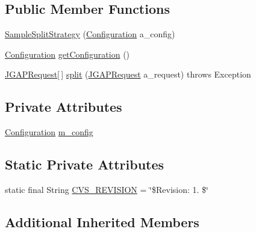 \subsection*{Public Member Functions}
\begin{DoxyCompactItemize}
\item 
\hyperlink{classorg_1_1jgap_1_1distr_1_1grid_1_1_sample_split_strategy_a3142f6f243c14087f08aa8d2aaba6652}{Sample\-Split\-Strategy} (\hyperlink{classorg_1_1jgap_1_1_configuration}{Configuration} a\-\_\-config)
\item 
\hyperlink{classorg_1_1jgap_1_1_configuration}{Configuration} \hyperlink{classorg_1_1jgap_1_1distr_1_1grid_1_1_sample_split_strategy_a196852dac1237e1e02777f5bf3ce816e}{get\-Configuration} ()
\item 
\hyperlink{classorg_1_1jgap_1_1distr_1_1grid_1_1_j_g_a_p_request}{J\-G\-A\-P\-Request}\mbox{[}$\,$\mbox{]} \hyperlink{classorg_1_1jgap_1_1distr_1_1grid_1_1_sample_split_strategy_ac7d09ab06f415b984bfd93703755ebea}{split} (\hyperlink{classorg_1_1jgap_1_1distr_1_1grid_1_1_j_g_a_p_request}{J\-G\-A\-P\-Request} a\-\_\-request)  throws Exception 
\end{DoxyCompactItemize}
\subsection*{Private Attributes}
\begin{DoxyCompactItemize}
\item 
\hyperlink{classorg_1_1jgap_1_1_configuration}{Configuration} \hyperlink{classorg_1_1jgap_1_1distr_1_1grid_1_1_sample_split_strategy_a8b525351206053287f004894a174c54f}{m\-\_\-config}
\end{DoxyCompactItemize}
\subsection*{Static Private Attributes}
\begin{DoxyCompactItemize}
\item 
static final String \hyperlink{classorg_1_1jgap_1_1distr_1_1grid_1_1_sample_split_strategy_ac8e2a8dfa62d18a1437cd9c05fa67269}{C\-V\-S\-\_\-\-R\-E\-V\-I\-S\-I\-O\-N} = \char`\"{}\$Revision\-: 1. \$\char`\"{}
\end{DoxyCompactItemize}
\subsection*{Additional Inherited Members}


